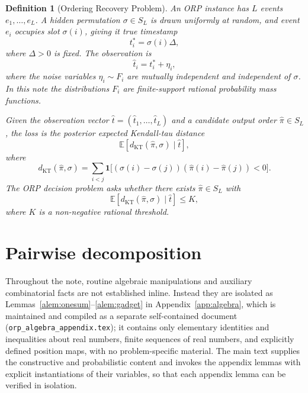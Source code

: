 \documentclass[11pt]{article}
\newtheorem{definition}{Definition}
\newcommand{\E}{\mathbb{E}}
\newcommand{\ind}{\mathbf{1}}
\newcommand{\KT}{\operatorname{KT}}
\begin{document}
\begin{definition}[Ordering Recovery Problem]
An ORP instance has $L$ events $e_1,\ldots,e_L$.  A hidden permutation $\sigma\in S_L$ is drawn uniformly at random, and event $e_i$ occupies slot $\sigma(i)$, giving it true timestamp
\begin{equation}
  t_i^*=\sigma(i)\Delta,
\end{equation}
where $\Delta>0$ is fixed.  The observation is
\begin{equation}
  \hat t_i=t_i^*+\eta_i,
\end{equation}
where the noise variables $\eta_i\sim F_i$ are mutually independent and independent of $\sigma$.  In this note the distributions $F_i$ are finite-support rational probability mass functions.

Given the observation vector $\hat t=(\hat t_1,\ldots,\hat t_L)$ and a candidate output order $\hat\pi\in S_L$, the loss is the posterior expected Kendall-tau distance
\begin{equation}
  \E\left[d_{\KT}(\hat\pi,\sigma)\mid \hat t\right],
\end{equation}
where
\begin{equation}
  d_{\KT}(\hat\pi,\sigma)
  =\sum_{i<j}
  \ind\!\big[(\sigma(i)-\sigma(j))(\hat\pi(i)-\hat\pi(j))<0\big].
\end{equation}
The ORP decision problem asks whether there exists $\hat\pi\in S_L$ with
\begin{equation}
  \E\left[d_{\KT}(\hat\pi,\sigma)\mid \hat t\right]\le K,
\end{equation}
where $K$ is a non-negative rational threshold.
\end{definition}

\section{Pairwise decomposition}

Throughout the note, routine algebraic manipulations and auxiliary combinatorial facts are not established inline.  Instead they are isolated as Lemmas~\ref{alem:onesum}--\ref{alem:gadget} in Appendix~\ref{app:algebra}, which is maintained and compiled as a separate self-contained document (\texttt{orp\_algebra\_appendix.tex}); it contains only elementary identities and inequalities about real numbers, finite sequences of real numbers, and explicitly defined position maps, with no problem-specific material.  The main text supplies the constructive and probabilistic content and invokes the appendix lemmas with explicit instantiations of their variables, so that each appendix lemma can be verified in isolation.
\end{document}
